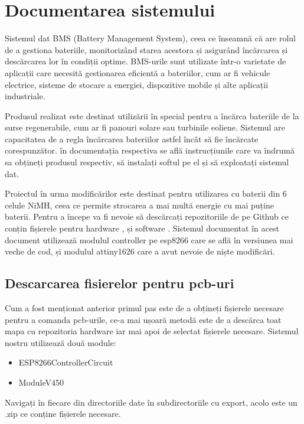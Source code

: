 \clearpage
\section{Documentarea sistemului}

Sistemul dat BMS (Battery Management System), ceea ce înseamnă că are rolul de a gestiona bateriile, monitorizând starea acestora și asigurând încărcarea și descărcarea lor în condiții optime. BMS-urile sunt utilizate într-o varietate de aplicații care necesită gestionarea eficientă a bateriilor, cum ar fi vehicule electrice, sisteme de stocare a energiei, dispozitive mobile și alte aplicații industriale.

Produsul realizat este destinat utilizării în special pentru a încărca bateriile de la surse regenerabile, cum ar fi panouri solare sau turbinile eoliene. Sistemul are capacitatea de a regla încărcarea bateriilor astfel încât să fie încărcate corespunzător. în documentația respectiva se află instrucțiunile care va îndrumă sa obțineți produsul respectiv, să instalați softul pe el și să exploatați sistemul dat.

Proiectul în urma modificărilor este destinat pentru utilizarea cu baterii din 6 celule NiMH, ceea ce permite strocarea a mai multă energie cu mai puține baterii.
Pentru a începe va fi nevoie să descărcați repozitoriile de pe Github ce conțin fișierele pentru hardware \cite{bmshard}, și software \cite{bmssoft}\cite{bmssoft32}. Sistemul documentat în acest document utilizează modulul controller pe esp8266 care se află în versiunea mai veche de cod, și modulul attiny1626 care a avut nevoie de niște modificări.

\subsection{Descarcarea fisierelor pentru pcb-uri}

Cum a fost menționat anterior primul pas este de a obțineți fișierele necesare pentru a comanda pcb-urile, 
ce-a mai ușoară metodă este de a descărca toat mapa cu repozitoria hardware \cite{bmshard} iar mai apoi de selectat fișierele necesare. Sistemul nostru utilizează două module:
\begin{itemize}
    \item ESP8266ControllerCircuit
    \item ModuleV450
\end{itemize}
Navigați în fiecare din directoriile date în subdirectoriile cu export, acolo este un .zip ce conține fișierele necesare.

